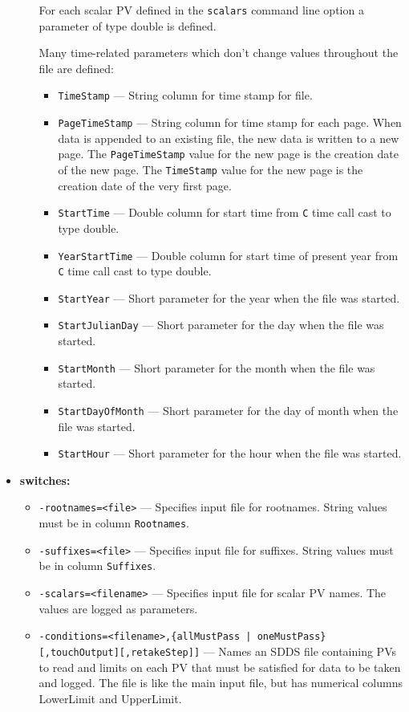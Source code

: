 \begin{itemize}
\begin{itemize}
For each scalar PV defined in the \verb+scalars+ command line option a parameter of type double is defined.

Many time-related parameters which don't change values throughout the file are defined:
\begin{itemize}
        \item {\tt TimeStamp} --- String column for time stamp for file.
        \item {\tt PageTimeStamp} --- String column for time stamp for each page. When data
                is appended to an existing file, the new data is written to a new
                page. The {\tt PageTimeStamp} value for the new page is the creation
                date of the new page. The {\tt TimeStamp} value for the new page is the creation 
                date of the very first page.
        \item {\tt StartTime} --- Double column for start time from {\tt C} time call cast to type double.
        \item {\tt YearStartTime} --- Double column for start time of present year from {\tt C} 
                time call cast to type double.
        \item {\verb+StartYear+} --- Short parameter for the year when the file was started.
        \item {\verb+StartJulianDay+} --- Short parameter for the day when the file was started.
        \item {\verb+StartMonth+} --- Short parameter for the month when the file was started.
        \item {\verb+StartDayOfMonth+} --- Short parameter for the day of month when the file was started.
        \item {\verb+StartHour+} --- Short parameter for the hour when the file was started.
\end{itemize}
\end{itemize}

%
\item {\bf switches:}
%
%
    \begin{itemize}
%
%
        \item {\tt -rootnames=<file>} --- Specifies input file for rootnames. String values
                must be in column \verb+Rootnames+.
        \item {\tt -suffixes=<file>} --- Specifies input file for suffixes. String values
                must be in column \verb+Suffixes+.
        \item {\tt -scalars=<filename>} ---  Specifies input file for scalar PV names. The values
                are logged as parameters.
        \item {\verb+-conditions=<filename>,{allMustPass | oneMustPass}[,touchOutput][,retakeStep]]+} --- 
                Names an SDDS file containing PVs to read and limits on each PV that must
                be satisfied for data to be taken and logged.  The file is like the main
                input file, but has numerical columns LowerLimit and UpperLimit.


\end{itemize}
\end{itemize}
